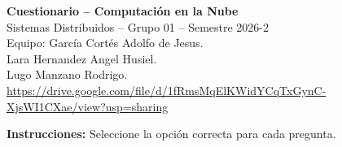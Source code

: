 \documentclass[12pt,letterpaper]{article}
\begin{document}
\begin{center}
    {\Large\bfseries Cuestionario -- Computaci\'on en la Nube}\\[0.3cm]
    {\normalsize Sistemas Distribuidos -- Grupo 01 -- Semestre 2026-2}\\[0.3cm]
    {\normalsize Equipo: García Cortés Adolfo de Jesus.}\\[0.3cm]
    {\normalsize Lara Hernandez Angel Husiel.}\\[0.3cm]
    {\normalsize Lugo Manzano Rodrigo.}\\[0.3cm]
    {\normalsize\url{https://drive.google.com/file/d/1fRmsMqElKWidYCqTxGynC-XjsWI1CXae/view?usp=sharing}}
\end{center}

\vspace{0.5cm}

\noindent\textbf{Instrucciones:} Seleccione la opci\'on correcta para cada pregunta.

\vspace{0.5cm}
\end{document}
